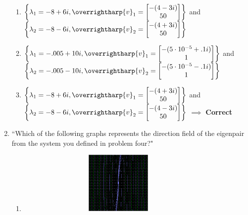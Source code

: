 \documentclass[11pt]{article}
\begin{document}
\begin{enumerate}
\begin{enumerate}
				\item \(\left\{\lambda_{1}=-8+6i, \overrightharp{v}_1=\begin{bmatrix} -(4-3i) \\ 50 \end{bmatrix}\right \}\) and \(\left\{\lambda_{2}=-8-6i, \overrightharp{v}_2=\begin{bmatrix} -(4+3i) \\ 50 \end{bmatrix}\right \}\)
				
				\item \(\left\{\lambda_{1}=-.005+10i, \overrightharp{v}_1=\begin{bmatrix} -(5\cdot 10^{-5}+.1i) \\ 1 \end{bmatrix}\right \}\) and \(\left\{\lambda_{2}=-.005-10i, \overrightharp{v}_2=\begin{bmatrix} -(5\cdot 10^{-5}-.1i) \\ 1 \end{bmatrix}\right \}\)
				
				\item \(\left\{\lambda_{1}=-8+6i, \overrightharp{v}_1=\begin{bmatrix} -(4+3i) \\ 50 \end{bmatrix}\right \}\) and \(\left\{\lambda_{2}=-8-6i, \overrightharp{v}_2=\begin{bmatrix} -(4-3i) \\ 50 \end{bmatrix}\right \}\) $\implies$ \textbf{Correct}
			\end{enumerate}
			
		\item ``Which of the following graphs represents the direction field of the eigenpair from the system you defined in problem four?"
		
			\begin{enumerate}
				\item \begin{figure}[h!]
					\graphicspath{{/Users/tylertrogden/Desktop/}}
					\includegraphics[height=3cm,width=8cm]{W11_WQ_Q6(a)} 
					\end{figure}


\end{enumerate}
\end{enumerate}
\end{document}
